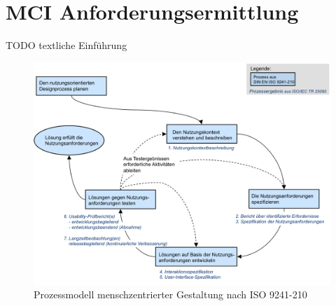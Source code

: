 
\chapter{MCI Anforderungsermittlung}

TODO textliche Einführung

\begin{figure}[H]
\includegraphics[width=.9\textwidth]{./images/prozessergebnisse.png}
\caption{Prozessmodell menschzentrierter Gestaltung nach ISO 9241-210}
\label{prozessmodell}
\end{figure}



\newpage



\newpage



\newpage



\newpage



\newpage



\newpage
